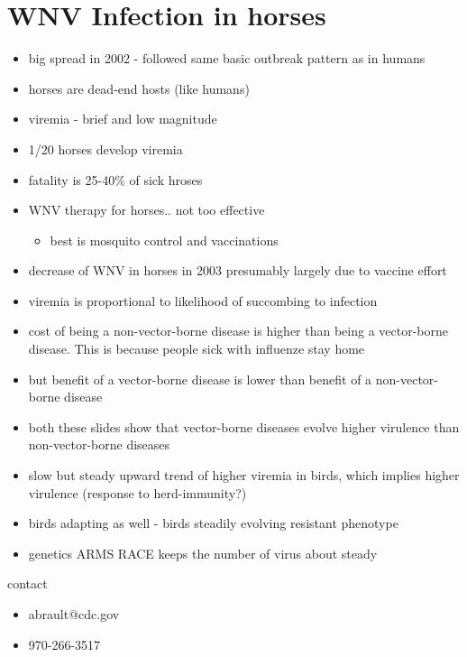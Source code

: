 \documentclass{article}
\begin{document}
    \section{WNV Infection in horses}
        \begin{itemize}
            \item big spread in 2002 - followed same basic outbreak pattern as in humans
            \item horses are dead-end hosts (like humans)
            \item viremia - brief and low magnitude
            \item 1/20 horses develop viremia
            \item fatality is 25-40\% of sick hroses
            \item WNV therapy for horses.. not too effective
            \begin{itemize}
                \item best is mosquito control and vaccinations
            \end{itemize}
            \item decrease of WNV in horses in 2003 presumably largely due to vaccine effort
            \item viremia is proportional to likelihood of succombing to infection
            \item cost of being a non-vector-borne disease is higher than being a vector-borne disease.  This is because people sick with influenze stay home
            \item but benefit of a vector-borne disease is lower than benefit of a non-vector-borne disease
            \item both these slides show that vector-borne diseases evolve higher virulence than non-vector-borne diseases
            \item slow but steady upward trend of higher viremia in birds, which implies higher virulence (response to herd-immunity?)
            \item birds adapting as well - birds steadily evolving resistant phenotype
            \item genetics ARMS RACE keeps the number of virus about steady
        \end{itemize}

        contact
        \begin{itemize}
            \item abrault@cdc.gov
            \item 970-266-3517
        \end{itemize}
\end{document}
